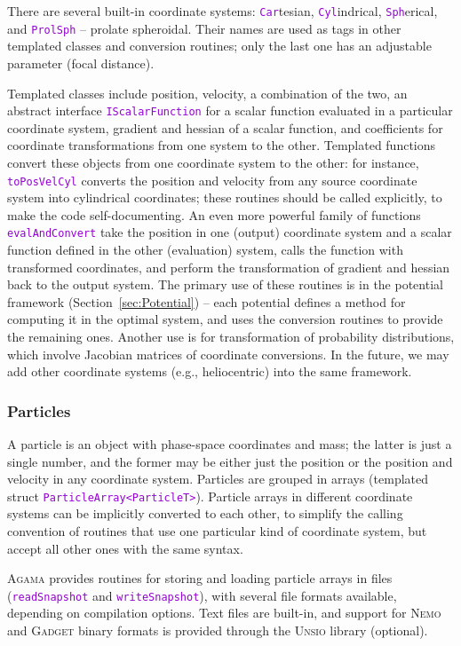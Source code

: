 \documentclass[12pt]{article}
\newcommand{\Agama}{\textsc{Agama}\xspace}
\newcommand{\Nemo} {\textsc{Nemo}\xspace}
\newcommand{\ttt}[1]{\textcolor{darkviolet}{\texttt{#1}}}
\begin{document}
There are several built-in coordinate systems: \ttt{Car}tesian, \ttt{Cyl}indrical, \ttt{Sph}erical, and \ttt{ProlSph} -- prolate spheroidal. Their names are used as tags in other templated classes and conversion routines; only the last one has an adjustable parameter (focal distance).

Templated classes include position, velocity, a combination of the two, an abstract interface \ttt{IScalarFunction} for a scalar function evaluated in a particular coordinate system, gradient and hessian of a scalar function, and coefficients for coordinate transformations from one system to the other. Templated functions convert these objects from one coordinate system to the other: for instance, \ttt{toPosVelCyl} converts the position and velocity from any source coordinate system into cylindrical coordinates; these routines should be called explicitly, to make the code self-documenting. An even more powerful family of functions \ttt{evalAndConvert} take the position in one (output) coordinate system and a scalar function defined in the other (evaluation) system, calls the function with transformed coordinates, and perform the transformation of gradient and hessian back to the output system. The primary use of these routines is in the potential framework (Section~\ref{sec:Potential}) -- each potential defines a method for computing it in the optimal system, and uses the conversion routines to provide the remaining ones. Another use is for transformation of probability distributions, which involve Jacobian matrices of coordinate conversions. In the future, we may add other coordinate systems (e.g., heliocentric) into the same framework.


\subsubsection{Particles}  \label{sec:Particles}
A particle is an object with phase-space coordinates and mass; the latter is just a single number, and the former may be either just the position or the position and velocity in any coordinate system. Particles are grouped in arrays (templated struct \ttt{ParticleArray<ParticleT>}).
Particle arrays in different coordinate systems can be implicitly converted to each other, to simplify the calling convention of routines that use one particular kind of coordinate system, but accept all other ones with the same syntax.

\Agama provides routines for storing and loading particle arrays in files (\ttt{readSnapshot} and \ttt{writeSnapshot}), with several file formats available, depending on compilation options. Text files are built-in, and support for \Nemo and \textsc{Gadget} binary formats is provided through the \textsc{Unsio} library (optional).
\end{document}
